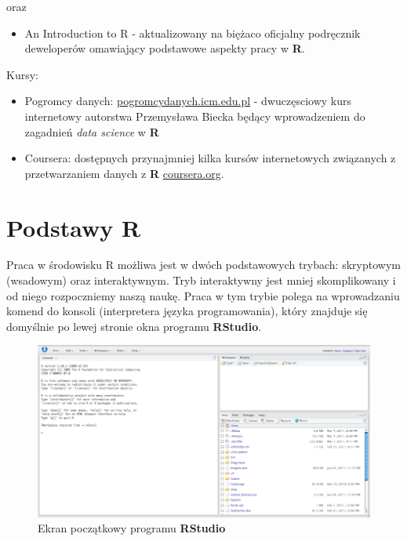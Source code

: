 \documentclass[]{book}
\providecommand{\tightlist}{%
  \setlength{\itemsep}{0pt}\setlength{\parskip}{0pt}}
\theoremstyle{definition}
\theoremstyle{definition}
\theoremstyle{definition}
\theoremstyle{remark}
\begin{document}
oraz

\begin{itemize}
\tightlist
\item
  An Introduction to R \citep{rintro2004} - aktualizowany na biężaco
  oficjalny podręcznik deweloperów \citep{r2016} omawiający podstawowe
  aspekty pracy w \textbf{R}.
\end{itemize}

Kursy:

\begin{itemize}
\tightlist
\item
  Pogromcy danych: \url{pogromcydanych.icm.edu.pl} - dwuczęsciowy kurs
  internetowy autorstwa Przemysława Biecka będący wprowadzeniem do
  zagadnień \emph{data science} w \textbf{R}
\item
  Coursera: dostępnych przynajmniej kilka kursów internetowych
  związanych z przetwarzaniem danych z \textbf{R} \url{coursera.org}.
\end{itemize}

\chapter{\texorpdfstring{Podstawy
\textbf{R}}{Podstawy R}}\label{podstawy-r}

Praca w środowisku R możliwa jest w dwóch podstawowych trybach:
skryptowym (wsadowym) oraz interaktywnym. Tryb interaktywny jest mniej
skomplikowany i od niego rozpoczniemy naszą naukę. Praca w tym trybie
polega na wprowadzaniu komend do konsoli (interpretera języka
programowania), który znajduje się domyślnie po lewej stronie okna
programu \textbf{RStudio}.

\begin{figure}
\centering
\includegraphics{figures/rstudio.png}
\caption{Ekran początkowy programu \textbf{RStudio}}
\end{figure}
\end{document}
